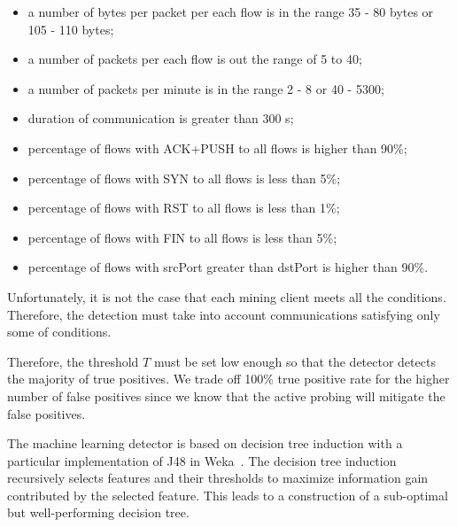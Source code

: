 \documentclass[preprint,12pt,3p]{elsarticle}
\begin{document}
\begin{itemize}
    \item a number of bytes per packet per each flow is in the range 35 - 80 bytes or 105 - 110 bytes;
    \item a number of packets per each flow is out the range of 5 to 40;
    \item a number of packets per minute is in the range 2 - 8 or 40 - 5300;
    \item duration of communication is greater than 300 s;
    \item percentage of flows with ACK+PUSH to all flows is higher than 90\%;
    \item percentage of flows with SYN to all flows is less than 5\%;
    \item percentage of flows with RST to all flows is less than 1\%;
    \item percentage of flows with FIN to all flows is less than 5\%;
    \item percentage of flows with srcPort greater than dstPort is higher than 90\%.
\end{itemize} 

Unfortunately, it is not the case that each mining client meets all the conditions. Therefore, the detection must take into account communications satisfying only some of conditions. 


Therefore, the threshold $T$ must be set low enough so that the detector detects the majority of true positives. 
We trade off 100\% true positive rate for the higher number of false positives since we know that the active probing will mitigate the false positives.

The machine learning detector is based on decision tree induction with a particular implementation of J48 in Weka~\cite{weka}.
The decision tree induction recursively selects features and their thresholds to maximize information gain contributed by the selected feature.
This leads to a construction of a sub-optimal but well-performing decision tree.
\end{document}
